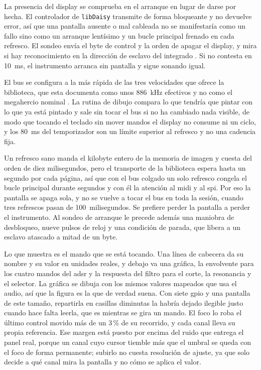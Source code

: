 La presencia del display se comprueba en el arranque en lugar de darse por
hecha. El controlador de \texttt{libDaisy} transmite de forma bloqueante y no
devuelve error, así que una pantalla ausente o mal cableada no se manifestaría
como un fallo sino como un arranque lentísimo y un bucle principal frenado en
cada refresco. El sondeo envía el byte de control y la orden de apagar el
display, y mira si hay reconocimiento en la dirección de esclavo del integrado
\cite{SSD1306}. Si no contesta en 10~ms, el instrumento arranca sin pantalla y
sigue sonando igual.

El bus se configura a la más rápida de las tres velocidades que ofrece la
biblioteca, que esta documenta como unos 886~kHz efectivos y no como el
megahercio nominal \cite{libDaisy}. La rutina de dibujo compara lo que tendría
que pintar con lo que ya está pintado y sale sin tocar el bus si no ha cambiado
nada visible, de modo que tocando el teclado sin mover mandos el display no
consume ni un ciclo, y los 80~ms del temporizador son un límite superior al
refresco y no una cadencia fija.

Un refresco sano manda el kilobyte entero de la memoria de imagen y cuesta del
orden de diez milisegundos, pero el transporte de la biblioteca espera hasta un
segundo por cada página, así que con el bus colgado un solo refresco congela el
bucle principal durante segundos y con él la atención al \gls{midi} y al
\gls{spi}. Por eso la pantalla se apaga sola, y no se vuelve a tocar el bus en
toda la sesión, cuando tres refrescos pasan de 100~milisegundos. Se
prefiere perder la pantalla a perder el instrumento. Al sondeo de arranque le
precede además una maniobra de desbloqueo, nueve pulsos de reloj y una
condición de parada, que libera a un esclavo atascado a mitad de un byte.

Lo que muestra es el mando que se está tocando. Una línea de cabecera da su
nombre y su valor en unidades reales, y debajo va una gráfica, la envolvente
para los cuatro mandos del \gls{adsr} y la respuesta del filtro para el corte,
la resonancia y el selector. La gráfica se dibuja con los mismos valores
mapeados que usa el audio, así que la figura es la que de verdad suena. Con
siete \gls{gpio} y una pantalla de este tamaño, repartirla en casillas diminutas la
habría dejado ilegible justo cuando hace falta leerla, que es mientras se gira
un mando. El foco lo roba el último control movido más de un 3\,\% de su
recorrido, y cada canal lleva su propia referencia. Ese margen está puesto por
encima del ruido que entrega el panel real, porque un canal cuyo cursor tiemble
más que el umbral se queda con el foco de forma permanente; subirlo no cuesta
resolución de ajuste, ya que solo decide a qué canal mira la pantalla y no cómo
se aplica el valor.

